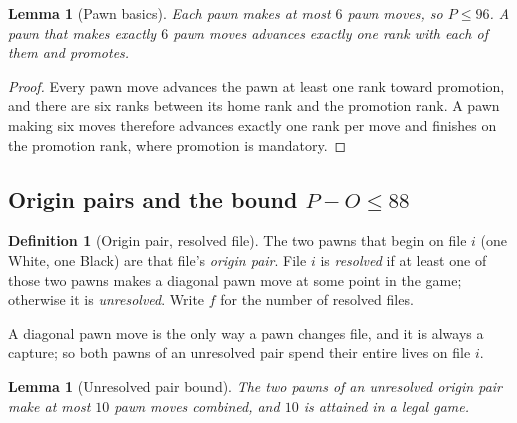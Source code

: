 \documentclass[11pt]{article}
\newtheorem{lemma}[theorem]{Lemma}
\theoremstyle{definition}
\newtheorem{definition}[theorem]{Definition}
\theoremstyle{remark}
\theoremstyle{plain}
\begin{document}
\begin{lemma}[Pawn basics]\label{lem:pawnbasics}
Each pawn makes at most $6$ pawn moves, so $P \le 96$. A pawn that makes
exactly $6$ pawn moves advances exactly one rank with each of them and
promotes.
\end{lemma}

\begin{proof}
Every pawn move advances the pawn at least one rank toward promotion, and
there are six ranks between its home rank and the promotion rank. A pawn
making six moves therefore advances exactly one rank per move and finishes
on the promotion rank, where promotion is mandatory.
\end{proof}

\subsection{Origin pairs and the bound \texorpdfstring{$P - O \le 88$}{P - O <= 88}}

\begin{definition}[Origin pair, resolved file]\label{def:originpair}
The two pawns that begin on file $i$ (one White, one Black) are that file's
\emph{origin pair}. File $i$ is \emph{resolved} if at least one of those two
pawns makes a diagonal pawn move at some point in the game; otherwise it is
\emph{unresolved}. Write $f$ for the number of resolved files.
\end{definition}

A diagonal pawn move is the only way a pawn changes file, and it is always a
capture; so both pawns of an unresolved pair spend their entire lives on
file $i$.

\begin{lemma}[Unresolved pair bound]\label{lem:cap10}
The two pawns of an unresolved origin pair make at most $10$ pawn moves
combined, and $10$ is attained in a legal game.
\end{lemma}
\end{document}
